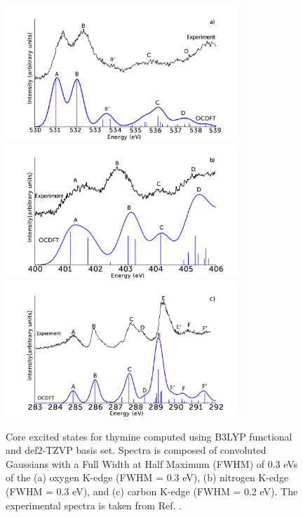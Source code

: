 \documentclass[12pt]{article}
\begin{document}
  \begin{figure}[!t]
\centering
\includegraphics[width=8.8cm]{ThymineOKexperiment.png}\\
\includegraphics[width=8.8cm]{ThymineNKexperiment.png} \\
\includegraphics[width=8.8cm]{ThymineCKexperiment.png}
\caption{Core excited states for thymine computed using B3LYP functional and def2-TZVP basis set. Spectra is composed of convoluted Gaussians with a Full Width at Half Maximum (FWHM) of 0.3 eVs of the (a) oxygen K-edge (FWHM = 0.3 eV), (b) nitrogen K-edge (FWHM = 0.3 eV), and (c) carbon K-edge (FWHM = 0.2 eV). The experimental spectra is taken from Ref. .}
\label{figure:Thymine}
\end{figure}
\end{document}
